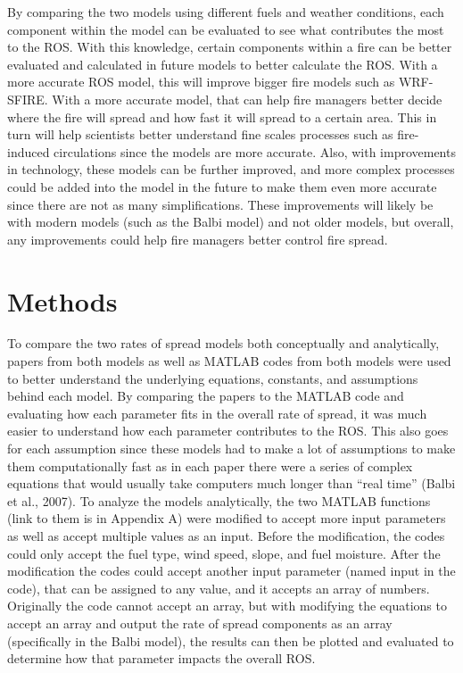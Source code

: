 \documentclass{article}
\begin{document}
\indent By comparing the two models using different fuels and weather conditions, each component within the model can be evaluated to see what contributes the most to the ROS. With this knowledge, certain components within a fire can be better evaluated and calculated in future models to better calculate the ROS. With a more accurate ROS model, this will improve bigger fire models such as WRF-SFIRE. With a more accurate model, that can help fire managers better decide where the fire will spread and how fast it will spread to a certain area. This in turn will help scientists better understand fine scales processes such as fire-induced circulations since the models are more accurate. Also, with improvements in technology, these models can be further improved, and more complex processes could be added into the model in the future to make them even more accurate since there are not as many simplifications. These improvements will likely be with modern models (such as the Balbi model) and not older models, but overall, any improvements could help fire managers better control fire spread. \\

\section{Methods}
To compare the two rates of spread models both conceptually and analytically, papers from both models as well as MATLAB codes from both models were used to better understand the underlying equations, constants, and assumptions behind each model. By comparing the papers to the MATLAB code and evaluating how each parameter fits in the overall rate of spread, it was much easier to understand how each parameter contributes to the ROS. This also goes for each assumption since these models had to make a lot of assumptions to make them computationally fast as in each paper there were a series of complex equations that would usually take computers much longer than “real time” (Balbi et al., 2007). 
To analyze the models analytically, the two MATLAB functions (link to them is in Appendix A) were modified to accept more input parameters as well as accept multiple values as an input. Before the modification, the codes could only accept the fuel type, wind speed, slope, and fuel moisture. After the modification the codes could accept another input parameter (named input in the code), that can be assigned to any value, and it accepts an array of numbers. Originally the code cannot accept an array, but with modifying the equations to accept an array and output the rate of spread components as an array (specifically in the Balbi model), the results can then be plotted and evaluated to determine how that parameter impacts the overall ROS. 
\end{document}
